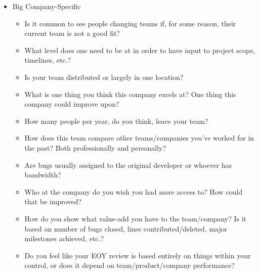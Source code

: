 \documentclass{article}
\begin{document}
\begin{itemize}
\begin{itemize}
	      \end{itemize}
	\item Big Company-Specific
	      \begin{itemize}
		      \item Is it common to see people changing teams if, for some reason, their current team is not a good fit?
		      \item What level does one need to be at in order to have input to project scope, timelines, etc.?
		      \item Is your team distributed or largely in one location?
		      \item What is one thing you think this company excels at? One thing this company could improve upon?
		      \item How many people per year, do you think, leave your team?
		      \item How does this team compare other teams/companies you've worked for in the past? Both professionally and personally?
		      \item Are bugs usually assigned to the original developer or whoever has bandwidth?
		      \item Who at the company do you wish you had more access to? How could that be improved?
		      \item How do you show what value-add you have to the team/company? Is it based on number of bugs closed, lines contributed/deleted, major milestones achieved, etc.?
		      \item Do you feel like your EOY review is based entirely on things within your control, or does it depend on team/product/company performance?
	      \end{itemize}
\end{itemize}
\end{document}
